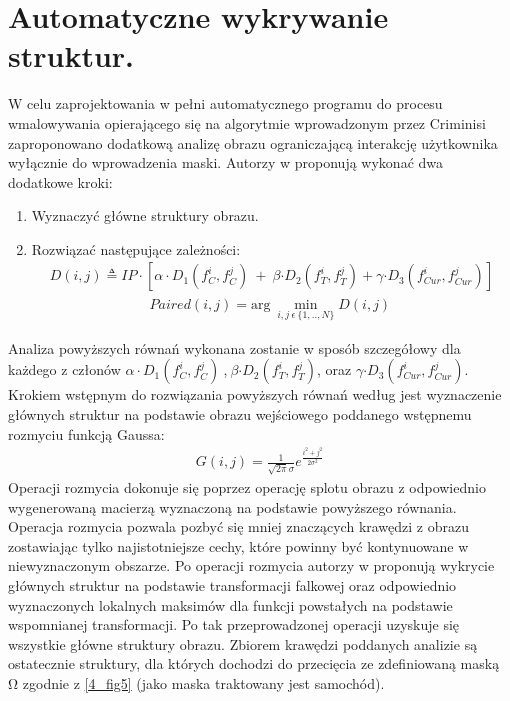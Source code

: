 \documentclass[12pt, twoside, openany]{report}
\theoremstyle{definition}
\begin{document}
\section{Automatyczne wykrywanie struktur.}
W celu zaprojektowania w pełni automatycznego programu do procesu wmalowywania opierającego się na algorytmie wprowadzonym przez Criminisi zaproponowano dodatkową analizę obrazu ograniczającą interakcję użytkownika wyłącznie do wprowadzenia maski. Autorzy w \cite{SalientStrucTexProp} proponują wykonać dwa dodatkowe kroki:
\begin{enumerate}
\item
Wyznaczyć główne struktury obrazu.
\item
Rozwiązać następujące zależności:
\begin{align}
D(i,j)\triangleq IP\cdot \left[\alpha \cdot D_1\left(f^i_C,f^j_C\right)\ +\ \beta {\cdot D}_2\left(f^i_T,f^j_T\right)+\gamma {\cdot D}_3\left(f^i_{Cur},f^j_{Cur}\right)\right]
\label{SalientDistance}
\end{align}
\begin{align}
Paired\left(i,j\right)={\mathrm{arg}\ \mathop{\mathrm{min}}_{i,j\ \epsilon \mathrm{\ }\{1,..,N\}} D(i,j)\ }
\label{SalientPair}
\end{align}
\end{enumerate}
Analiza powyższych równań wykonana zostanie w sposób szczegółowy dla każdego z członów $\alpha \cdot D_1\left(f^i_C,f^j_C\right)\ $,$\ \beta {\cdot D}_2\left(f^i_T,f^j_T\right)$, oraz $\gamma {\cdot D}_3\left(f^i_{Cur},f^j_{Cur}\right)$. Krokiem wstępnym do rozwiązania powyższych równań według \cite{SalientStrucTexProp} jest wyznaczenie głównych struktur na podstawie obrazu wejściowego poddanego wstępnemu rozmyciu funkcją Gaussa:
\begin{align}
G\left(i,j\right)=\frac{1}{\sqrt{2\pi }\sigma }e^{\frac{i^2+j^2}{2{\sigma }^2}}
\label{rozmycieGaussa}
\end{align}
Operacji rozmycia dokonuje się poprzez operację splotu obrazu z odpowiednio wygenerowaną macierzą wyznaczoną na podstawie powyższego równania. Operacja rozmycia pozwala pozbyć się mniej znaczących krawędzi z obrazu zostawiając tylko najistotniejsze cechy, które powinny być kontynuowane w niewyznaczonym obszarze. Po operacji rozmycia autorzy w \cite{SalientStrucTexProp} proponują wykrycie głównych struktur na podstawie transformacji falkowej oraz odpowiednio wyznaczonych lokalnych maksimów dla funkcji powstałych na podstawie wspomnianej transformacji. Po tak  przeprowadzonej operacji uzyskuje się wszystkie główne struktury obrazu. Zbiorem krawędzi poddanych analizie są ostatecznie struktury, dla których dochodzi do przecięcia ze zdefiniowaną maską $\mathrm{\Omega }$ zgodnie z \autoref{4_fig5} (jako maska traktowany jest samochód).
\end{document}
